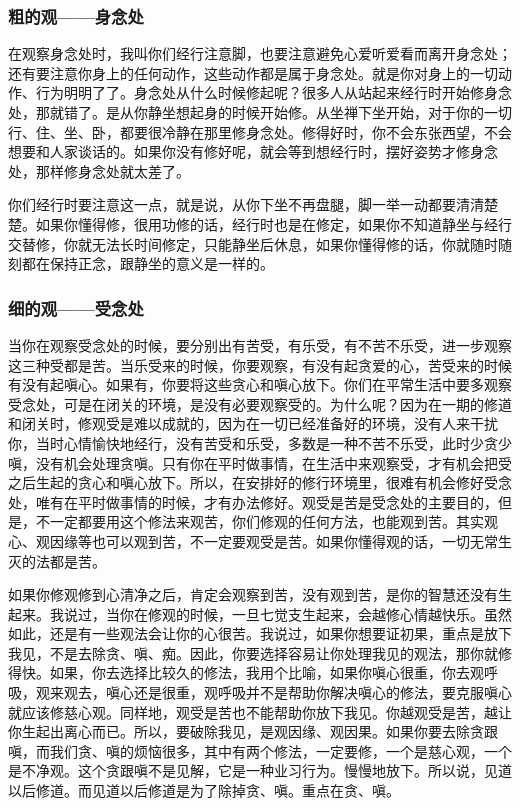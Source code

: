 \documentclass{book}
\begin{document}
\subsubsection{粗的观——身念处}

在观察身念处时，我叫你们经行注意脚，也要注意避免心爱听爱看而离开身念处；还有要注意你身上的任何动作，这些动作都是属于身念处。就是你对身上的一切动作、行为明明了了。身念处从什么时候修起呢？很多人从站起来经行时开始修身念处，那就错了。是从你静坐想起身的时候开始修。从坐禅下坐开始，对于你的一切行、住、坐、卧，都要很冷静在那里修身念处。修得好时，你不会东张西望，不会想要和人家谈话的。如果你没有修好呢，就会等到想经行时，摆好姿势才修身念处，那样修身念处就太差了。

你们经行时要注意这一点，就是说，从你下坐不再盘腿，脚一举一动都要清清楚楚。如果你懂得修，很用功修的话，经行时也是在修定，如果你不知道静坐与经行交替修，你就无法长时间修定，只能静坐后休息，如果你懂得修的话，你就随时随刻都在保持正念，跟静坐的意义是一样的。

\subsubsection{细的观——受念处}

当你在观察受念处的时候，要分别出有苦受，有乐受，有不苦不乐受，进一步观察这三种受都是苦。当乐受来的时候，你要观察，有没有起贪爱的心，苦受来的时候有没有起嗔心。如果有，你要将这些贪心和嗔心放下。你们在平常生活中要多观察受念处，可是在闭关的环境，是没有必要观察受的。为什么呢？因为在一期的修道和闭关时，修观受是难以成就的，因为在一切已经准备好的环境，没有人来干扰你，当时心情愉快地经行，没有苦受和乐受，多数是一种不苦不乐受，此时少贪少嗔，没有机会处理贪嗔。只有你在平时做事情，在生活中来观察受，才有机会把受之后生起的贪心和嗔心放下。所以，在安排好的修行环境里，很难有机会修好受念处，唯有在平时做事情的时候，才有办法修好。观受是苦是受念处的主要目的，但是，不一定都要用这个修法来观苦，你们修观的任何方法，也能观到苦。其实观心、观因缘等也可以观到苦，不一定要观受是苦。如果你懂得观的话，一切无常生灭的法都是苦。

如果你修观修到心清净之后，肯定会观察到苦，没有观到苦，是你的智慧还没有生起来。我说过，当你在修观的时候，一旦七觉支生起来，会越修心情越快乐。虽然如此，还是有一些观法会让你的心很苦。我说过，如果你想要证初果，重点是放下我见，不是去除贪、嗔、痴。因此，你要选择容易让你处理我见的观法，那你就修得快。如果，你去选择比较久的修法，我用个比喻，如果你嗔心很重，你去观呼吸，观来观去，嗔心还是很重，观呼吸并不是帮助你解决嗔心的修法，要克服嗔心就应该修慈心观。同样地，观受是苦也不能帮助你放下我见。你越观受是苦，越让你生起出离心而已。所以，要破除我见，是观因缘、观因果。如果你要去除贪跟嗔，而我们贪、嗔的烦恼很多，其中有两个修法，一定要修，一个是慈心观，一个是不净观。这个贪跟嗔不是见解，它是一种业习行为。慢慢地放下。所以说，见道以后修道。而见道以后修道是为了除掉贪、嗔。重点在贪、嗔。
\end{document}
